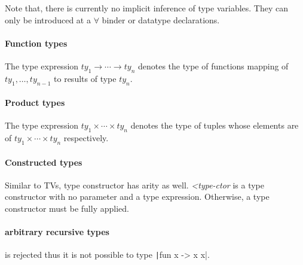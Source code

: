 \documentclass[a4paper, 11pt]{article}
\theoremstyle{remark}\newtheorem*{remark}{Remark}
\theoremstyle{definition}\newtheorem*{definition}{Definition}
\begin{document}
Note that, there is currently no implicit inference of type variables. They can only be introduced at a \(\forall\) binder
or datatype declarations.
\paragraph{Function types}
The type expression \(ty_1\to\cdots\to ty_n\) denotes the type of functions mapping of \(ty_1,\dots,ty_{n-1}\) to results of type \(ty_n\).
\paragraph{Product types}
The type expression \(ty_1\times\cdots\times ty_n\) denotes the type
of tuples whose elements are of \(ty_1\times\cdots\times ty_n\) respectively.
\paragraph{Constructed types} Similar to TVs, type constructor has arity as well. \emph{<type-ctor} is a type constructor with no parameter and a type expression. Otherwise, a type constructor must be fully applied.
\paragraph{arbitrary recursive types}\label{para:equirecursive}
is rejected thus it is not possible to type \texttt|fun x -> x x|.
\end{document}
